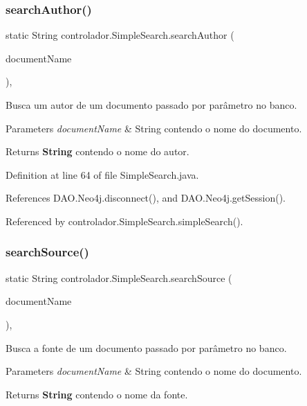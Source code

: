 \subsubsection{\texorpdfstring{search\+Author()}{searchAuthor()}}
{\footnotesize\ttfamily static String controlador.\+Simple\+Search.\+search\+Author (\begin{DoxyParamCaption}\item[{String}]{document\+Name }\end{DoxyParamCaption})\hspace{0.3cm}{\ttfamily [static]}, {\ttfamily [private]}}

Busca um autor de um documento passado por parâmetro no banco. 
\begin{DoxyParams}{Parameters}
{\em document\+Name} & String contendo o nome do documento. \\
\hline
\end{DoxyParams}
\begin{DoxyReturn}{Returns}
{\bfseries String} contendo o nome do autor. 
\end{DoxyReturn}


Definition at line 64 of file Simple\+Search.\+java.



References D\+A\+O.\+Neo4j.\+disconnect(), and D\+A\+O.\+Neo4j.\+get\+Session().



Referenced by controlador.\+Simple\+Search.\+simple\+Search().

\hypertarget{classcontrolador_1_1SimpleSearch_aae34b43930609372fac59a868498b659}{}\label{classcontrolador_1_1SimpleSearch_aae34b43930609372fac59a868498b659} 
\subsubsection{\texorpdfstring{search\+Source()}{searchSource()}}
{\footnotesize\ttfamily static String controlador.\+Simple\+Search.\+search\+Source (\begin{DoxyParamCaption}\item[{String}]{document\+Name }\end{DoxyParamCaption})\hspace{0.3cm}{\ttfamily [static]}, {\ttfamily [private]}}

Busca a fonte de um documento passado por parâmetro no banco. 
\begin{DoxyParams}{Parameters}
{\em document\+Name} & String contendo o nome do documento. \\
\hline
\end{DoxyParams}
\begin{DoxyReturn}{Returns}
{\bfseries String} contendo o nome da fonte. 
\end{DoxyReturn}


